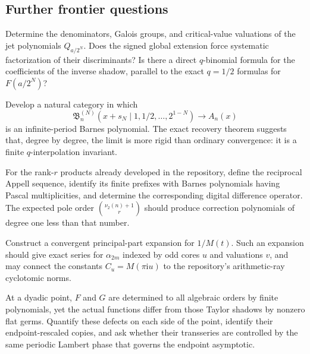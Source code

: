 \documentclass[11pt,oneside]{article}
\theoremstyle{frontier}
\theoremstyle{definition}
\theoremstyle{remark}
\newcommand{\ii}{\mathrm i}
\newcommand{\vtwo}{\nu_2}
\begin{document}
\subsection{Further frontier questions}

\begin{frontierbox}
Determine the denominators, Galois groups, and critical-value valuations of the jet polynomials
$Q_{a/2^N}$.  Does the signed global extension force systematic factorization of their
discriminants?  Is there a direct $q$-binomial formula for the coefficients of the inverse shadow,
parallel to the exact $q=1/2$ formulas for $F(a/2^N)$?
\end{frontierbox}

\begin{frontierbox}
Develop a natural category in which
\[
 \mathfrak B_n^{(N)}(x+s_N\mid1,1/2,\ldots,2^{1-N})\longrightarrow A_n(x)
\]
is an infinite-period Barnes polynomial.  The exact recovery theorem suggests that, degree by
degree, the limit is more rigid than ordinary convergence: it is a finite $q$-interpolation invariant.
\end{frontierbox}

\begin{frontierbox}
For the rank-$r$ products already developed in the repository, define the reciprocal Appell sequence,
identify its finite prefixes with Barnes polynomials having Pascal multiplicities, and determine the
corresponding digital difference operator.  The expected pole order
$\binom{\vtwo(n)+1}{r}$ should produce correction polynomials of degree one less than that number.
\end{frontierbox}

\begin{frontierbox}
Construct a convergent principal-part expansion for $1/M(t)$.  Such an expansion should give exact
series for $\alpha_{2m}$ indexed by odd cores $u$ and valuations $v$, and may connect the constants
$C_u=M(\pi\ii u)$ to the repository's arithmetic-ray cyclotomic norms.
\end{frontierbox}

\begin{frontierbox}
At a dyadic point, $F$ and $G$ are determined to all algebraic orders by finite polynomials, yet the
actual functions differ from those Taylor shadows by nonzero flat germs.  Quantify these defects on
each side of the point, identify their endpoint-rescaled copies, and ask whether their transseries are
controlled by the same periodic Lambert phase that governs the endpoint asymptotic.
\end{frontierbox}
\end{document}
